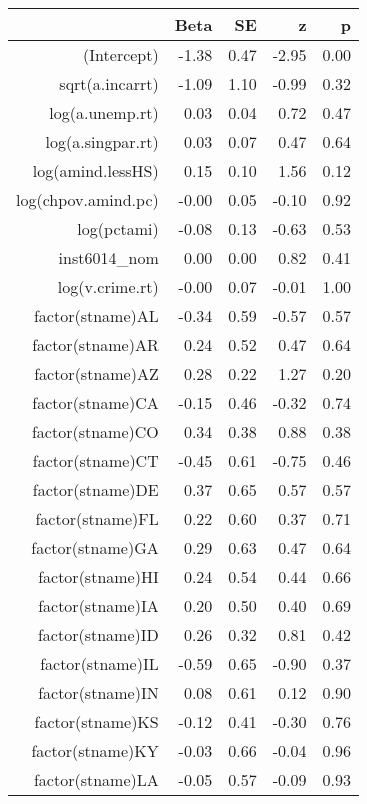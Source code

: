 \begin{table}[ht]
\centering
\begin{tabular}{rrrrr}
  \hline
 & Beta & SE & z & p \\ 
  \hline
(Intercept) & -1.38 & 0.47 & -2.95 & 0.00 \\ 
  sqrt(a.incarrt) & -1.09 & 1.10 & -0.99 & 0.32 \\ 
  log(a.unemp.rt) & 0.03 & 0.04 & 0.72 & 0.47 \\ 
  log(a.singpar.rt) & 0.03 & 0.07 & 0.47 & 0.64 \\ 
  log(amind.lessHS) & 0.15 & 0.10 & 1.56 & 0.12 \\ 
  log(chpov.amind.pc) & -0.00 & 0.05 & -0.10 & 0.92 \\ 
  log(pctami) & -0.08 & 0.13 & -0.63 & 0.53 \\ 
  inst6014\_nom & 0.00 & 0.00 & 0.82 & 0.41 \\ 
  log(v.crime.rt) & -0.00 & 0.07 & -0.01 & 1.00 \\ 
  factor(stname)AL & -0.34 & 0.59 & -0.57 & 0.57 \\ 
  factor(stname)AR & 0.24 & 0.52 & 0.47 & 0.64 \\ 
  factor(stname)AZ & 0.28 & 0.22 & 1.27 & 0.20 \\ 
  factor(stname)CA & -0.15 & 0.46 & -0.32 & 0.74 \\ 
  factor(stname)CO & 0.34 & 0.38 & 0.88 & 0.38 \\ 
  factor(stname)CT & -0.45 & 0.61 & -0.75 & 0.46 \\ 
  factor(stname)DE & 0.37 & 0.65 & 0.57 & 0.57 \\ 
  factor(stname)FL & 0.22 & 0.60 & 0.37 & 0.71 \\ 
  factor(stname)GA & 0.29 & 0.63 & 0.47 & 0.64 \\ 
  factor(stname)HI & 0.24 & 0.54 & 0.44 & 0.66 \\ 
  factor(stname)IA & 0.20 & 0.50 & 0.40 & 0.69 \\ 
  factor(stname)ID & 0.26 & 0.32 & 0.81 & 0.42 \\ 
  factor(stname)IL & -0.59 & 0.65 & -0.90 & 0.37 \\ 
  factor(stname)IN & 0.08 & 0.61 & 0.12 & 0.90 \\ 
  factor(stname)KS & -0.12 & 0.41 & -0.30 & 0.76 \\ 
  factor(stname)KY & -0.03 & 0.66 & -0.04 & 0.96 \\ 
  factor(stname)LA & -0.05 & 0.57 & -0.09 & 0.93 \\ 

\end{tabular}
\end{table}
